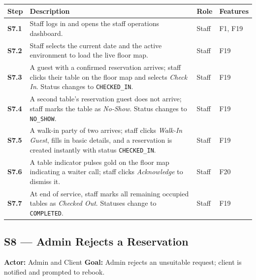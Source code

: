 \documentclass[12pt,a4paper]{article}
\begin{document}
\begin{longtable}{>{\bfseries}l L{6.5cm} l L{3cm}}
    \toprule
    Step & Description & Role & Features \\
    \midrule
    S7.1 & Staff logs in and opens the staff operations dashboard. & Staff & F1, F19 \\
    S7.2 & Staff selects the current date and the active environment
           to load the live floor map. & Staff & F19 \\
    S7.3 & A guest with a confirmed reservation arrives; staff clicks
           their table on the floor map and selects \emph{Check In}.
           Status changes to \texttt{CHECKED\_IN}. & Staff & F19 \\
    S7.4 & A second table's reservation guest does not arrive; staff
           marks the table as \emph{No-Show}. Status changes to
           \texttt{NO\_SHOW}. & Staff & F19 \\
    S7.5 & A walk-in party of two arrives; staff clicks \emph{Walk-In
           Guest}, fills in basic details, and a reservation is created
           instantly with status \texttt{CHECKED\_IN}. & Staff & F19 \\
    S7.6 & A table indicator pulses gold on the floor map indicating a
           waiter call; staff clicks \emph{Acknowledge} to dismiss it. & Staff & F20 \\
    S7.7 & At end of service, staff marks all remaining occupied tables
           as \emph{Checked Out}. Statuses change to \texttt{COMPLETED}. & Staff & F19 \\
    \bottomrule
\end{longtable}

\subsection*{S8 --- Admin Rejects a Reservation}
\begin{mdframed}[style=scenariobox]
\textbf{Actor:} Admin and Client \quad
\textbf{Goal:} Admin rejects an unsuitable request; client is notified
and prompted to rebook.
\end{mdframed}
\end{document}

